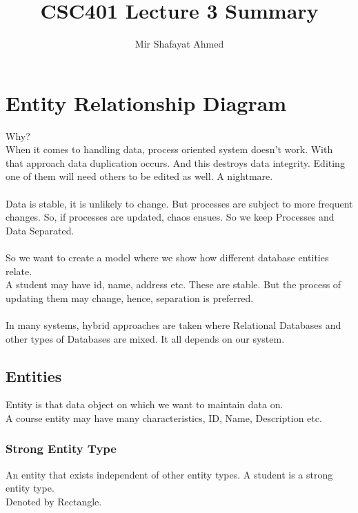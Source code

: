 \documentclass{article}
\title{CSC401 Lecture 3 Summary}
\author{Mir Shafayat Ahmed}
\begin{document}
    \pagecolor[HTML]{FFFFCC}
    \maketitle
    \section{Entity Relationship Diagram}
        Why?\\
        When it comes to handling data, process oriented system doesn't work. With that approach data duplication occurs. And this destroys data integrity. Editing one of them will need others to be edited as well. A nightmare.
        \paragraph{}
        Data is stable, it is unlikely to change. But processes are subject to more frequent changes. So, if processes are updated, chaos ensues. So we keep Processes and Data Separated.
        \paragraph{}
        So we want to create a model where we show how different database entities relate.\\
        A student may have id, name, address etc. These are stable. But the process of updating them may change, hence, separation is preferred.
        \paragraph{}
        In many systems, hybrid approaches are taken where Relational Databases and other types of Databases are mixed. It all depends on our system.

        \subsection{Entities}
            Entity is that data object on which we want to maintain data on.\\
            A course entity may have many characteristics, ID, Name, Description etc.
            \subsubsection{Strong Entity Type}
                An entity that exists independent of other entity types. A student is a strong entity type.\\
                Denoted by Rectangle.
\end{document}
